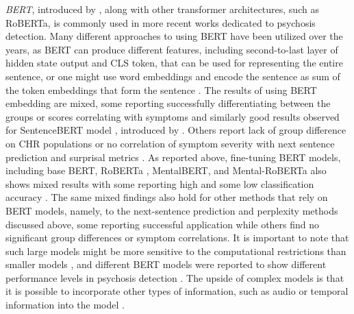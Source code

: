 \textit{BERT}, introduced by \citet{devlin2018bert}, along with other transformer architectures, such as RoBERTa, is commonly used in more recent works dedicated to psychosis detection. Many different approaches to using BERT have been utilized over the years, as BERT can produce different features, including second-to-last layer of hidden state output and CLS token, that can be used for representing the entire sentence, or one might use word embeddings and encode the sentence as sum of the token embeddings that form the sentence \citep{xu2022fully}. The results of using BERT embedding are mixed, some reporting successfully differentiating between the groups or scores correlating with symptoms \citep{ryazanskaya2020automated, xu2022fully, srivastava2022p473} and similarly good results observed for SentenceBERT model \citep{xu2022fully}, introduced by \citet{reimers2019sentence}. Others report lack of group difference on CHR populations \citep{hitczenko2021understanding, bilgrami2022construct} or no correlation of symptom severity with next sentence prediction and surprisal metrics \citep{jeong2023exploring}. As reported above, fine-tuning BERT models, including base BERT, RoBERTa \citep{liu2019roberta}, MentalBERT, and Mental-RoBERTa \citep{ji2021mentalbert} also shows mixed results with some reporting high \citep{wouts2021belabbert, shriki2022masking} and some low classification accuracy \citep{aich2022towards}. The same mixed findings also hold for other methods that rely on BERT models, namely, to the next-sentence prediction and perplexity methods discussed above, some reporting successful application while others find no significant group differences or symptom correlations. It is important to note that such large models might be more sensitive to the computational restrictions than smaller models \citep{kaplan2020scaling}, and different BERT models were reported to show different performance levels in psychosis detection \citep{aich2022towards}. The upside of complex models is that it is possible to incorporate other types of information, such as audio or temporal information into the model \citep{xu2022fully, wouts2021belabbert}.


